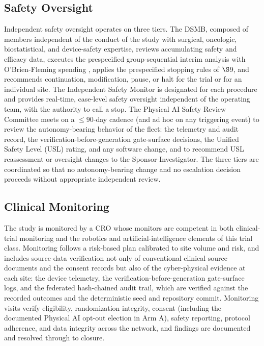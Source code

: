 \subsection{Safety Oversight}

Independent safety oversight operates on three tiers. The DSMB, composed of members
independent of the conduct of the study with surgical, oncologic, biostatistical,
and device-safety expertise, reviews accumulating safety and efficacy data,
executes the prespecified group-sequential interim analysis with O'Brien-Fleming
spending \cite{DeMets1994lan}, applies the prespecified stopping rules of $\S$9, and
recommends continuation, modification, pause, or halt for the trial or for an
individual site. The Independent Safety Monitor is designated for each procedure and
provides real-time, case-level safety oversight independent of the operating team,
with the authority to call a stop. The Physical AI Safety Review Committee meets on a
$\leq 90$-day cadence (and ad hoc on any triggering event) to review the
autonomy-bearing behavior of the fleet: the telemetry and audit record, the
verification-before-generation gate-surface decisions, the Unified Safety Level
(USL) rating, and any software change, and to recommend USL reassessment or
oversight changes to the Sponsor-Investigator. The three tiers are coordinated so
that no autonomy-bearing change and no escalation decision proceeds without
appropriate independent review.

\subsection{Clinical Monitoring}

The study is monitored by a CRO whose monitors are competent in both clinical-trial
monitoring and the robotics and artificial-intelligence elements of this trial
class. Monitoring follows a risk-based plan calibrated to site volume and risk, and
includes source-data verification not only of conventional clinical source
documents and the consent records but also of the cyber-physical evidence at each
site: the device telemetry, the verification-before-generation gate-surface logs,
and the federated hash-chained audit trail, which are verified against the recorded
outcomes and the deterministic seed and repository commit. Monitoring visits verify
eligibility, randomization integrity, consent (including the documented Physical AI
opt-out election in Arm A), safety reporting, protocol adherence, and data
integrity across the network, and findings are documented and resolved through to
closure.

